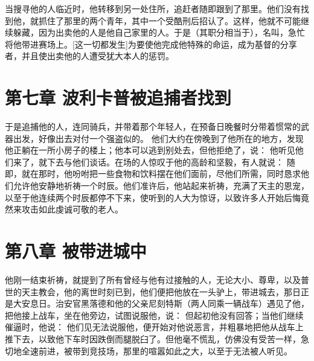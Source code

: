 当搜寻他的人临近时，他转移到另一处住所，追赶者随即跟到了那里。他们没有找到他，就抓住了那里的两个青年，其中一个受酷刑后招认了。这样，他就不可能继续躲藏，因为出卖他的人是他自己家里的人。于是（其职分相当于），名叫，急忙将他带进赛场上。[这一切都发生]为要使他完成他特殊的命运，成为基督的分享者，并且使出卖他的人遭受犹大本人的惩罚。\par


\section{第七章 波利卡普被追捕者找到}

于是追捕他的人，连同骑兵，并带着那个年轻人，在预备日晚餐时分带着惯常的武器出发，好像出去对付一个强盗似的。 他们大约在傍晚到了他所在的地方，发现他正躺在一所小房子的楼上；他本可以逃到别处去，但他拒绝了，说：  他听见他们来了，就下去与他们谈话。在场的人惊叹于他的高龄和坚毅，有人就说： 随即，就在那时，他吩咐把一些食物和饮料摆在他们面前，尽他们所需，同时恳求他们允许他安静地祈祷一个时辰。他们准许后，他站起来祈祷，充满了天主的恩宠，以至于他连续两个时辰都停不下来，使听到的人大为惊讶，以致许多人开始后悔竟然来攻击如此虔诚可敬的老人。\par


\section{第八章 被带进城中}

他刚一结束祈祷，就提到了所有曾经与他有过接触的人，无论大小、尊卑，以及普世的天主教会，他的离世时刻已到，他们便把他放在一头驴上，带进城去，那日正是大安息日。治安官黑落德和他的父亲尼刻特斯（两人同乘一辆战车）遇见了他，把他接上战车，坐在他旁边，试图说服他，说： 但起初他没有回答；当他们继续催逼时，他说： 他们见无法说服他，便开始对他说恶言，并粗暴地把他从战车上推下去，以致他下车时因跌倒而腿脱臼了。但他毫不慌乱，仿佛没有受苦一样，急切地全速前进，被带到竞技场，那里的喧嚣如此之大，以至于无法被人听见。\par

